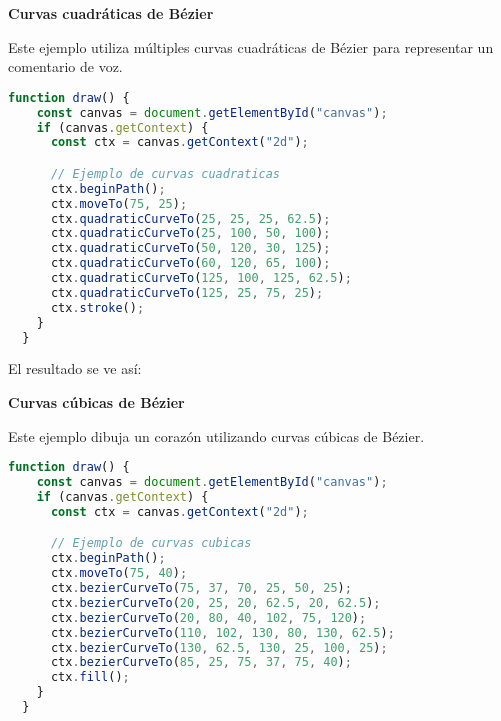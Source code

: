 \newpage %
\textbf{Curvas cuadráticas de Bézier}

Este ejemplo utiliza múltiples curvas cuadráticas de Bézier para representar un comentario de voz.

\vspace{0.5cm} %
\begin{lstlisting}[language=TypeScript, style=mystyle]
  function draw() {
    const canvas = document.getElementById("canvas");
    if (canvas.getContext) {
      const ctx = canvas.getContext("2d");

      // Ejemplo de curvas cuadraticas
      ctx.beginPath();
      ctx.moveTo(75, 25);
      ctx.quadraticCurveTo(25, 25, 25, 62.5);
      ctx.quadraticCurveTo(25, 100, 50, 100);
      ctx.quadraticCurveTo(50, 120, 30, 125);
      ctx.quadraticCurveTo(60, 120, 65, 100);
      ctx.quadraticCurveTo(125, 100, 125, 62.5);
      ctx.quadraticCurveTo(125, 25, 75, 25);
      ctx.stroke();
    }
  }
\end{lstlisting}
\vspace{0.5cm} %

El resultado se ve así:
\begin{center}
\end{center}

\newpage %
\textbf{Curvas cúbicas de Bézier}

Este ejemplo dibuja un corazón utilizando curvas cúbicas de Bézier.

\vspace{0.5cm} %
\begin{lstlisting}[language=TypeScript, style=mystyle]
  function draw() {
    const canvas = document.getElementById("canvas");
    if (canvas.getContext) {
      const ctx = canvas.getContext("2d");

      // Ejemplo de curvas cubicas
      ctx.beginPath();
      ctx.moveTo(75, 40);
      ctx.bezierCurveTo(75, 37, 70, 25, 50, 25);
      ctx.bezierCurveTo(20, 25, 20, 62.5, 20, 62.5);
      ctx.bezierCurveTo(20, 80, 40, 102, 75, 120);
      ctx.bezierCurveTo(110, 102, 130, 80, 130, 62.5);
      ctx.bezierCurveTo(130, 62.5, 130, 25, 100, 25);
      ctx.bezierCurveTo(85, 25, 75, 37, 75, 40);
      ctx.fill();
    }
  }
\end{lstlisting}

